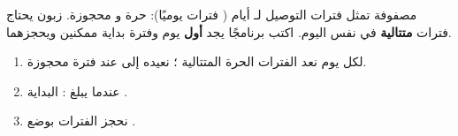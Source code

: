 \begin{statement}
مصفوفة  تمثل فترات التوصيل لـ  أيام ( فترات يوميًا):  حرة و محجوزة. زبون يحتاج  فترات \textbf{متتالية} في نفس اليوم. اكتب برنامجًا يجد \textbf{أول} يوم وفترة بداية ممكنين ويحجزهما.
\end{statement}
\begin{stepsbox}\begin{enumerate}
\item لكل يوم نعد الفترات الحرة المتتالية ؛ نعيده إلى  عند فترة محجوزة.
\item عندما يبلغ : البداية .
\item نحجز الفترات بوضع .
\end{enumerate}\end{stepsbox}

